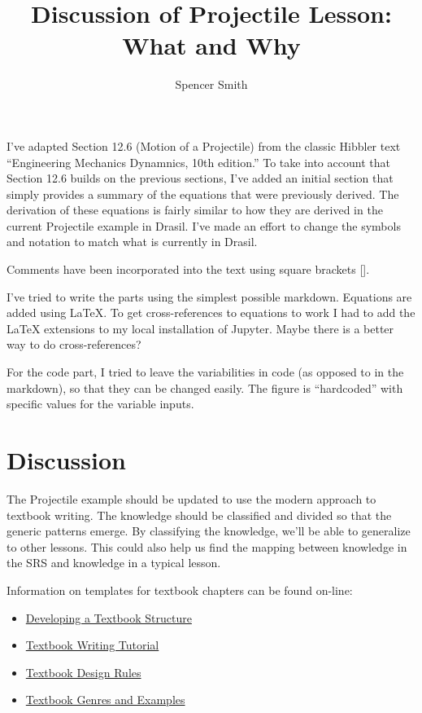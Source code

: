 \documentclass[12pt]{article}
\title{Discussion of Projectile Lesson: What and Why}
\author{Spencer Smith}
\begin{document}
\maketitle

I've adapted Section 12.6 (Motion of a Projectile) from the classic Hibbler text
``Engineering Mechanics Dynamnics, 10th edition.''  To take into account that
Section 12.6 builds on the previous sections, I've added an initial section that
simply provides a summary of the equations that were previously derived.  The
derivation of these equations is fairly similar to how they are derived in the
current Projectile example in Drasil.  I've made an effort to change the symbols
and notation to match what is currently in Drasil.

Comments have been incorporated into the text using square brackets [].

I've tried to write the parts using the simplest possible markdown.  Equations
are added using LaTeX.  To get cross-references to equations to work I had to
add the LaTeX extensions to my local installation of Jupyter.  Maybe there is a
better way to do cross-references?

For the code part, I tried to leave the variabilities in code (as opposed to in
the markdown), so that they can be changed easily.  The figure is ``hardcoded''
with specific values for the variable inputs.

\section {Discussion}

The Projectile example should be updated to use the modern approach to textbook
writing.  The knowledge should be classified and divided so that the generic
patterns emerge.  By classifying the knowledge, we'll be able to generalize to
other lessons.  This could also help us find the mapping between knowledge in
the SRS and knowledge in a typical lesson.

Information on templates for textbook chapters can be found on-line:

\begin{itemize}
\item
  \href{https://canvas.umn.edu/courses/106630/pages/developing-a-textbook-structure?module_item_id=1306060}
  {Developing a Textbook Structure}
\item \href{http://edutechwiki.unige.ch/en/Textbook_writing_tutorial} {Textbook
    Writing Tutorial}
\item
  \href{https://open.ubc.ca/open-publishing-guide/phase-4/textbook-design-rules/}
  {Textbook Design Rules}
\item
  \href{http://edutechwiki.unige.ch/en/Textbook_genres_and_examples#E-Learning_and_the_Science_of_Instruction}
  {Textbook Genres and Examples}
\end{itemize}
\end{document}
